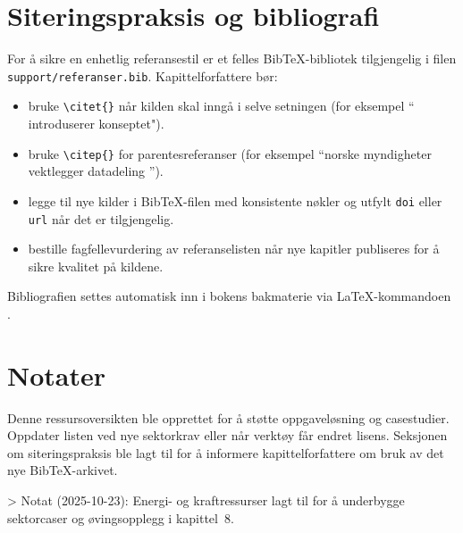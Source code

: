 \section{Siteringspraksis og bibliografi}
For å sikre en enhetlig referansestil er et felles Bib\TeX-bibliotek tilgjengelig i filen \texttt{support/referanser.bib}. Kapittelforfattere bør:
\begin{itemize}
    \item bruke \verb+\citet{}+ når kilden skal inngå i selve setningen (for eksempel ``\citet{grieves2017digital} introduserer konseptet").
    \item bruke \verb+\citep{}+ for parentesreferanser (for eksempel ``norske myndigheter vektlegger datadeling \citep{regjeringen2022datastrategi}'').
    \item legge til nye kilder i Bib\TeX-filen med konsistente nøkler og utfylt \texttt{doi} eller \texttt{url} når det er tilgjengelig.
    \item bestille fagfellevurdering av referanselisten når nye kapitler publiseres for å sikre kvalitet på kildene.
\end{itemize}

Bibliografien settes automatisk inn i bokens bakmaterie via \LaTeX-kommandoen \verb++.

\section{Notater}
Denne ressursoversikten ble opprettet for å støtte oppgaveløsning og casestudier. Oppdater listen ved nye sektorkrav eller når verktøy får endret lisens. Seksjonen om siteringspraksis ble lagt til for å informere kapittelforfattere om bruk av det nye Bib\TeX-arkivet.

> Notat (2025-10-23): Energi- og kraftressurser lagt til for å underbygge sektorcaser og øvingsopplegg i kapittel~8.
